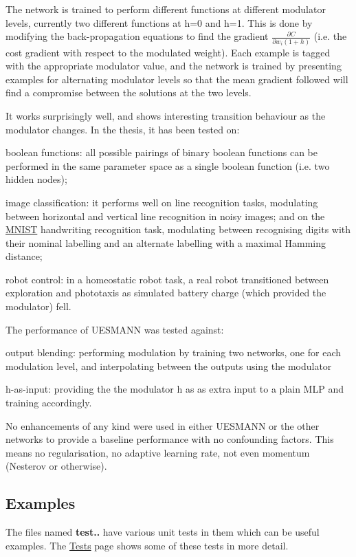 The network is trained to perform different functions at different modulator levels, currently two different functions at h=0 and h=1. This is done by modifying the back-\/propagation equations to find the gradient $\frac{\partial C}{\partial w_i(1+h) }$ (i.\+e. the cost gradient with respect to the modulated weight). Each example is tagged with the appropriate modulator value, and the network is trained by presenting examples for alternating modulator levels so that the mean gradient followed will find a compromise between the solutions at the two levels.

It works surprisingly well, and shows interesting transition behaviour as the modulator changes. In the thesis, it has been tested on\+:


\begin{DoxyItemize}
\item boolean functions\+: all possible pairings of binary boolean functions can be performed in the same parameter space as a single boolean function (i.\+e. two hidden nodes);
\item image classification\+: it performs well on line recognition tasks, modulating between horizontal and vertical line recognition in noisy images; and on the \hyperlink{classMNIST}{M\+N\+I\+ST} handwriting recognition task, modulating between recognising digits with their nominal labelling and an alternate labelling with a maximal Hamming distance;
\item robot control\+: in a homeostatic robot task, a real robot transitioned between exploration and phototaxis as simulated battery charge (which provided the modulator) fell.
\end{DoxyItemize}

The performance of U\+E\+S\+M\+A\+NN was tested against\+:


\begin{DoxyItemize}
\item output blending\+: performing modulation by training two networks, one for each modulation level, and interpolating between the outputs using the modulator
\item h-\/as-\/input\+: providing the the modulator h as as extra input to a plain M\+LP and training accordingly.
\end{DoxyItemize}

No enhancements of any kind were used in either U\+E\+S\+M\+A\+NN or the other networks to provide a baseline performance with no confounding factors. This means no regularisation, no adaptive learning rate, not even momentum (Nesterov or otherwise).

\subsection*{Examples}

The files named {\bfseries test..} have various unit tests in them which can be useful examples. The \hyperlink{tests}{Tests} page shows some of these tests in more detail. 